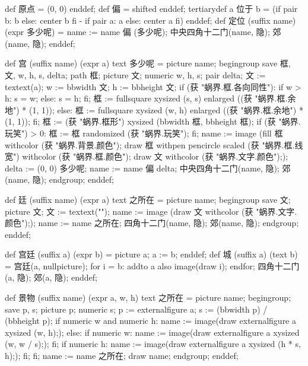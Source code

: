 \startMPinclusions[+]
def 原点 = (0, 0) enddef;
def 偏 = shifted enddef;
tertiarydef a 位于 b =
  (if pair b: b else: center b fi - if pair a: a else: center a fi)
enddef;
def 定位 (suffix name) (expr 多少呢) =
  name := name 偏 (多少呢);
  中央四角十二门(name, 隐); 郊(name, 隐);
enddef;
\stopMPinclusions

\startMPinclusions[+]
def 宫 (suffix name) (expr a) text 多少呢 =
  picture name;
  begingroup
  save 框, 文, w, h, s, delta;
  path 框; picture 文; numeric w, h, s; pair delta;
  文 := textext(a);
  w := bbwidth 文; h := bbheight 文;
  if (获 "蜗界.框.各向同性"):
    if w > h: s = w; else: s = h; fi;
    框 := fullsquare xysized (s, s) enlarged ((获 "蜗界.框.余地") * (1, 1));
  else:
    框 := fullsquare xysized (w, h) enlarged ((获 "蜗界.框.余地") * (1, 1));
  fi;
  框 := (获 "蜗界.框形") xysized (bbwidth 框, bbheight 框);
  if (获 "蜗界.玩笑") > 0: 框 := 框 randomized (获 "蜗界.玩笑"); fi;
  name := image (fill 框 withcolor (获 "蜗界.背景.颜色");
                 draw 框 withpen pencircle scaled (获 "蜗界.框.线宽")
                         withcolor (获 "蜗界.框.颜色");
                 draw 文 withcolor (获 "蜗界.文字.颜色"););
  delta := (0, 0) 多少呢;
  name := name 偏 delta;
  中央四角十二门(name, 隐); 郊(name, 隐);
  endgroup;
enddef;
\stopMPinclusions

\startMPinclusions[+]
def 廷 (suffix name) (expr a) text 之所在 =
  picture name;
  begingroup
    save 文; picture 文; 文 := textext("");
    name := image (draw 文 withcolor (获 "蜗界.文字.颜色"););
    name := name 之所在; 四角十二门(name, 隐); 郊(name, 隐);
  endgroup;
enddef;
\stopMPinclusions

\startMPinclusions[+]
def 宫廷 (suffix a) (expr b) = picture a; a := b; enddef;
def 城 (suffix a) (text b) =
  宫廷(a, nullpicture);
  for i = b: addto a also image(draw i); endfor;
  四角十二门(a, 隐); 郊(a, 隐);
enddef;
\stopMPinclusions

\startMPinclusions[+]
def 景物 (suffix name) (expr a, w, h) text 之所在 =
  picture name;
  begingroup;
  save p, s; picture p; numeric s;
  p := externalfigure a;
  s := (bbwidth p) / (bbheight p);
  if numeric w and numeric h:
    name := image(draw externalfigure a xysized (w, h););
  else:
    if numeric w:
      name := image(draw externalfigure a xysized (w, w / s););
    fi;
    if numeric h:
       name := image(draw externalfigure a xysized (h * s, h););
    fi;
  fi;
  name := name 之所在;
  draw name;  
  endgroup;
enddef;
\stopMPinclusions

